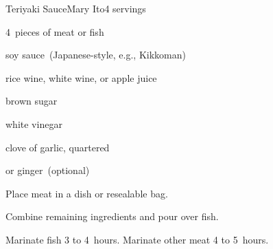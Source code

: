 \begin{recipe}{Teriyaki Sauce}{Mary Ito}{4 servings}

\begin{ingredients}
\item 4~pieces of meat or fish
\item \C{\half} soy sauce~(Japanese-style, e.g., Kikkoman)
\item \C{\third} rice wine, white wine, or apple juice
\item \C{\quarter} brown sugar
\item {} white vinegar
\item clove of garlic, quartered
\item {} or \tp{\half} ginger~(optional)
\end{ingredients}

\begin{directions}
\item Place meat in a dish or resealable bag.
\item Combine remaining ingredients and pour over fish.
\item Marinate fish 3 to 4~hours. Marinate other meat 4 to 5~hours.
\end{directions}

\end{recipe}
